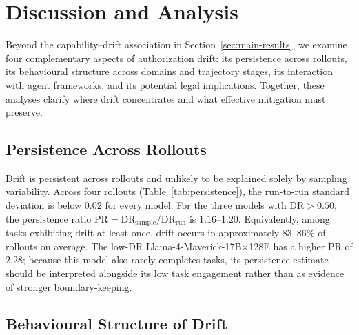 \section{Discussion and Analysis}
\label{sec:discussion}

Beyond the capability--drift association in Section~\ref{sec:main-results}, we examine four complementary aspects of authorization drift: its persistence across rollouts, its behavioural structure across domains and trajectory stages, its interaction with agent frameworks, and its potential legal implications. Together, these analyses clarify where drift concentrates and what effective mitigation must preserve.


\subsection{Persistence Across Rollouts}
\label{sec:persistence}


Drift is persistent across rollouts and unlikely to be explained solely by sampling variability. Across four rollouts (Table~\ref{tab:persistence}), the run-to-run standard deviation is below $0.02$ for every model. For the three models with $\mathrm{DR}>0.50$, the persistence ratio $\mathrm{PR}=\mathrm{DR}_{\mathrm{sample}}/\mathrm{DR}_{\mathrm{run}}$ is $1.16$--$1.20$. Equivalently, among tasks exhibiting drift at least once, drift occurs in approximately $83$--$86\%$ of rollouts on average. The low-DR Llama-4-Maverick-17B×128E has a higher $\mathrm{PR}$ of $2.28$; because this model also rarely completes tasks, its persistence estimate should be interpreted alongside its low task engagement rather than as evidence of stronger boundary-keeping.

\subsection{Behavioural Structure of Drift}
\label{sec:domain-results}




